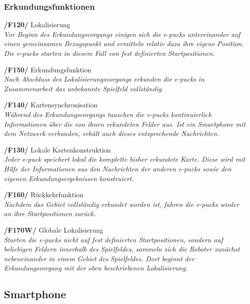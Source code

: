 \documentclass[10pt,a4paper]{article}
\begin{document}
			\subsubsection{Erkundungsfunktionen}
				\begin{list}{}{\leftmargin=1cm}
					\item[\textbf{/F120/}] Lokalisierung
						\\ \textsl{Vor Beginn des Erkundungsvorgangs einigen sich die e-pucks untereinander auf einen gemeinsamen Bezugspunkt
						und ermitteln relativ dazu ihre eigene Position. Die e-pucks starten in diesem Fall von fest definierten Startpositionen.}
					\item[\textbf{/F150/}] Erkundungsfunktion
						\\ \textsl{Nach Abschluss des Lokalisierungsvorgangs erkunden die e-pucks in Zusammenarbeit das unbekannte
							Spielfeld vollständig.}
					\item[\textbf{/F140/}] Kartensynchronisation
						\\ \textsl{Während des Erkundungsvorgangs tauschen die e-pucks kontinuierlich Informationen über die von ihnen
						erkundeten Felder aus. Ist ein Smartphone mit dem Netzwerk verbunden, erhält auch dieses entsprechende Nachrichten.}
					\item[\textbf{/F130/}] Lokale Kartenkonstruktion	
						\\ \textsl{Jeder e-puck speichert lokal die komplette bisher erkundete Karte. Diese wird mit Hilfe
						der Informationen aus den Nachrichten der anderen e-pucks sowie den eigenen Erkundungsergebnissen konstruiert.} 				
					\item[\textbf{/F160/}] Rückkehrfunktion
						\\ \textsl{Nachdem das Gebiet vollständig erkundet worden ist, fahren die e-pucks wieder an ihre Startpositionen
						zurück.}
					\item[\textbf{/F170W/}] Globale Lokalisierung
						\\ \textsl{Starten die e-pucks nicht auf fest definierten Startpositionen, sondern auf beliebigen Feldern innerhalb
							des Spielfeldes, sammeln sich die Roboter zunächst nebeneinander in einem Gebiet des Spielfeldes. Dort beginnt der
							Erkundungsvorgang mit der oben beschriebenen Lokalisierung.}
				\end{list}
		\subsection{Smartphone}
\end{document}

